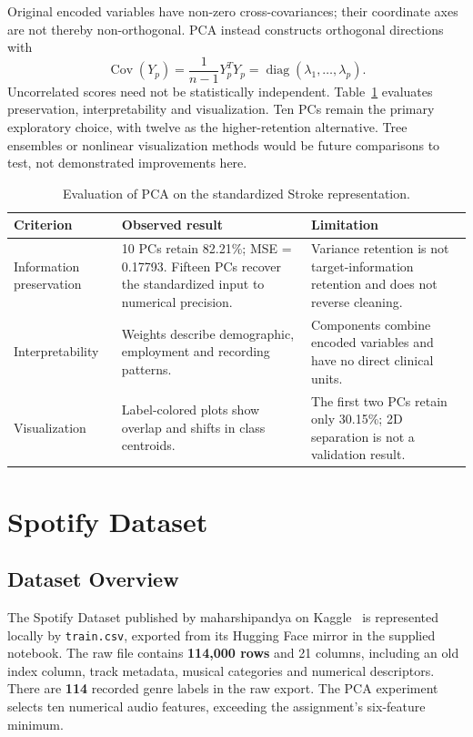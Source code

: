 \documentclass[12pt, a4paper]{article}
\begin{document}
Original encoded variables have non-zero cross-covariances; their coordinate axes are not thereby non-orthogonal. PCA instead constructs orthogonal directions with
\[
\operatorname{Cov}(Y_p)=\frac1{n-1}Y_p^TY_p=\operatorname{diag}(\lambda_1,\ldots,\lambda_p).
\]
Uncorrelated scores need not be statistically independent. Table~\ref{tab:stroke-evaluation} evaluates preservation, interpretability and visualization. Ten PCs remain the primary exploratory choice, with twelve as the higher-retention alternative. Tree ensembles or nonlinear visualization methods would be future comparisons to test, not demonstrated improvements here.
\begin{table}[htbp]
\centering\small
\setlength{\tabcolsep}{4pt}\renewcommand{\arraystretch}{1.12}
\caption{Evaluation of PCA on the standardized Stroke representation.}
\label{tab:stroke-evaluation}
\begin{tabular}{p{.22\linewidth}p{.34\linewidth}p{.34\linewidth}}
\toprule
\raggedright \textbf{Criterion} & \raggedright \textbf{Observed result} & \raggedright \textbf{Limitation} \tabularnewline
\midrule
\raggedright Information preservation & \raggedright 10 PCs retain 82.21\%; MSE = 0.17793. Fifteen PCs recover the standardized input to numerical precision. & \raggedright Variance retention is not target-information retention and does not reverse cleaning. \tabularnewline
\raggedright Interpretability & \raggedright Weights describe demographic, employment and recording patterns. & \raggedright Components combine encoded variables and have no direct clinical units. \tabularnewline
\raggedright Visualization & \raggedright Label-colored plots show overlap and shifts in class centroids. & \raggedright The first two PCs retain only 30.15\%; 2D separation is not a validation result. \tabularnewline
\bottomrule
\end{tabular}
\end{table}

\clearpage
\section{Spotify Dataset}
\subsection{Dataset Overview}
The Spotify Dataset published by maharshipandya on Kaggle~\cite{spotify-data} is represented locally by \texttt{train.csv}, exported from its Hugging Face mirror in the supplied notebook. The raw file contains \textbf{114,000 rows} and 21 columns, including an old index column, track metadata, musical categories and numerical descriptors. There are \textbf{114} recorded genre labels in the raw export. The PCA experiment selects ten numerical audio features, exceeding the assignment's six-feature minimum.
\end{document}
